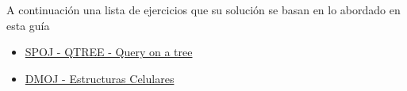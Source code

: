 A continuación una lista de ejercicios que su solución se basan en lo abordado en esta guía

\begin{itemize}
	\item \href{https://www.spoj.com/problems/QTREE/}{ SPOJ - QTREE - Query on a tree}
	\item \href{https://dmoj.uclv.edu.cu/problem/ecelulares}{ DMOJ - Estructuras Celulares}
\end{itemize}